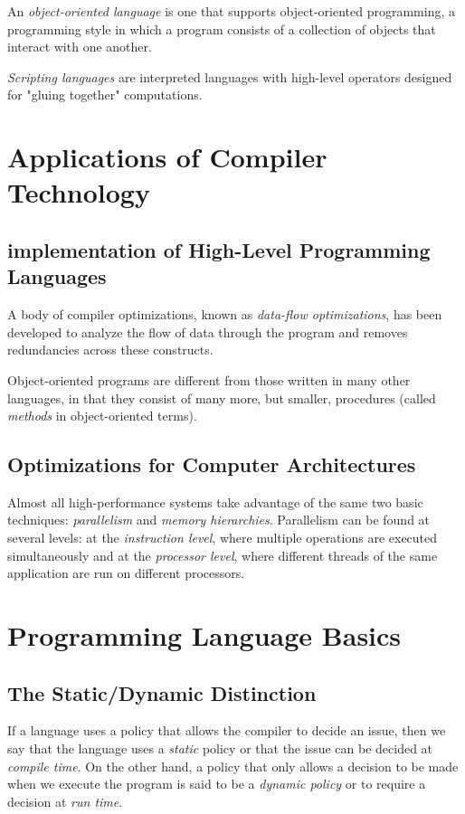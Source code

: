 \documentclass[a4paper,twoside]{book}
\begin{document}
An \textit{object-oriented language} is one that supports object-oriented programming, a programming style in which a program consists of a collection of objects that interact with one another.

\textit{Scripting languages} are interpreted languages with high-level operators designed for "gluing together" computations.

\section{Applications of Compiler Technology}
\subsection{implementation of High-Level Programming Languages}

A body of compiler optimizations, known as \textit{data-flow optimizations}, has been developed to analyze the flow of data through the program and removes redundancies across these constructs.

Object-oriented programs are different from those written in many other languages, in that they consist of many more, but smaller, procedures (called \textit{methods} in object-oriented terms).

\subsection{Optimizations for Computer Architectures}

Almost all high-performance systems take advantage of the same two basic techniques: \textit{parallelism} and \textit{memory hierarchies}. Parallelism can be found at several levels: at the \textit{instruction level}, where multiple operations are executed simultaneously and at the \textit{processor level}, where different threads of the same application are run on different processors.

\section{Programming Language Basics}
\subsection{The Static/Dynamic Distinction}

If a language uses a policy that allows the compiler to decide an issue, then we say that the language uses a \textit{static} policy or that the issue can be decided at \textit{compile time}. On the other hand, a policy that only allows a decision to be made when we execute the program is said to be a \textit{dynamic policy} or to require a decision at \textit{run time}.
\end{document}

